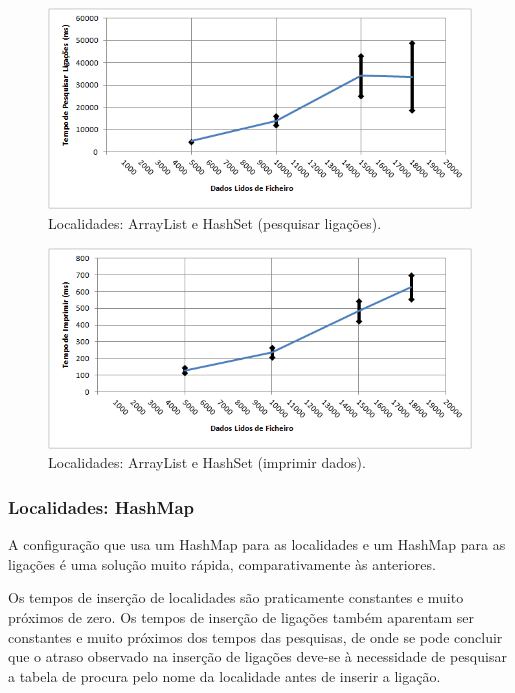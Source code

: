 \documentclass[a5paper,twocolumn, 11pt]{article}
\begin{document}
\begin{figure}[h!b!t!]
    \caption[Localidades: ArrayList e HashSet (pesquisar ligações)]{Localidades: ArrayList e HashSet (pesquisar ligações).}
    \label{hashtable}
    \centering
        \includegraphics[width=400pt]{cloc_conf2_o4.png}
\end{figure}
\begin{figure}[h!b!t!]
    \caption[Localidades: ArrayList e HashSet (imprimir dados)]{Localidades: ArrayList e HashSet (imprimir dados).}
    \label{hashtable}
    \centering
        \includegraphics[width=400pt]{cloc_conf2_o5.png}
\end{figure}

\newpage
\twocolumn
\subsubsection{Localidades: HashMap}
A configuração que usa um HashMap para as localidades e um HashMap para as ligações é uma solução muito rápida, comparativamente às anteriores.

Os tempos de inserção de localidades são praticamente constantes e muito próximos de zero. Os tempos de inserção de ligações também aparentam ser constantes e muito próximos dos tempos das pesquisas, de onde se pode concluir que o atraso observado na inserção de ligações deve-se à necessidade de pesquisar a tabela de procura pelo nome da localidade antes de inserir a ligação.
\end{document}
